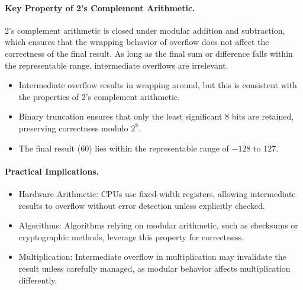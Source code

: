 \paragraph{Key Property of 2's Complement Arithmetic.}
2's complement arithmetic is closed under modular addition and subtraction, which ensures that the wrapping behavior of overflow does not affect the correctness of the final result. As long as the final sum or difference falls within the representable range, intermediate overflows are irrelevant.
\begin{itemize}
    \item Intermediate overflow results in wrapping around, but this is consistent with the properties of 2's complement arithmetic.
    \item Binary truncation ensures that only the least significant 8 bits are retained, preserving correctness modulo \( 2^8 \).
    \item The final result (\( 60 \)) lies within the representable range of \( -128 \) to \( 127 \).
\end{itemize}

\paragraph{Practical Implications.}
\begin{itemize}
    \item Hardware Arithmetic:
    CPUs use fixed-width registers, allowing intermediate results to overflow without error detection unless explicitly checked.
    \item Algorithms:
    Algorithms relying on modular arithmetic, such as checksums or cryptographic methods, leverage this property for correctness.
    \item Multiplication:
    Intermediate overflow in multiplication may invalidate the result unless carefully managed, as modular behavior affects multiplication differently.
\end{itemize}


